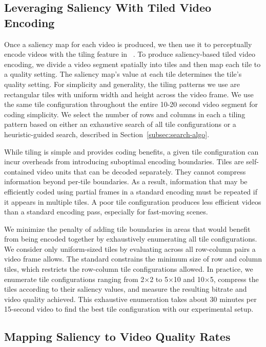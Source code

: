 \subsection{Leveraging Saliency With Tiled Video Encoding}
\label{subsec:tiles}

Once a saliency map for each video is produced, we then use it to perceptually encode videos with the tiling feature in \hevc~\cite{hevc}.
To produce saliency-based tiled video encoding, we divide a video segment spatially into tiles and then map each tile to a quality setting.
The saliency map's value at each tile determines the tile's quality setting.
For simplicity and generality, the tiling patterns we use are rectangular tiles with uniform width and height across the video frame.
We use the same tile configuration throughout the entire 10-20 second video segment for coding simplicity.
We select the number of rows and columns in each a tiling pattern based on either an exhaustive search of all tile configurations or a heuristic-guided search, described in Section~\ref{subsec:search-algo}.

While tiling is simple and provides coding benefits, a given tile configuration can incur overheads from introducing suboptimal encoding boundaries.
Tiles are self-contained video units that can be decoded separately.
They cannot compress information beyond per-tile boundaries.
As a result, information that may be efficiently coded using partial frames in a standard encoding must be repeated if it appears in multiple tiles.
A poor tile configuration produces less efficient videos than a standard encoding pass, especially for fast-moving scenes.

We minimize the penalty of adding tile boundaries in areas that would benefit from being encoded together by exhaustively enumerating all tile configurations.
We consider only uniform-sized tiles by evaluating across all row-column pairs a video frame allows.
The \hevc standard constrains the minimum size of row and column tiles, which restricts the row-column tile configurations allowed.
In practice, we enumerate tile configurations ranging from 2$\times$2 to 5$\times$10 and 10$\times$5, compress the tiles according to their saliency values, and measure the resulting bitrate and video quality achieved.
This exhaustive enumeration takes about 30 minutes per 15-second video to find the best tile configuration with our experimental setup.

\saliencyTilesOverviewFigure

\subsection{Mapping Saliency to Video Quality Rates}
\label{subsec:mapping}

